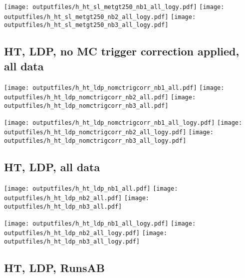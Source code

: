 \documentclass[11pt]{article}
\begin{document}
    \noindent
     \texttt{[image: outputfiles/h\_ht\_sl\_metgt250\_nb1\_all\_logy.pdf]}
     \texttt{[image: outputfiles/h\_ht\_sl\_metgt250\_nb2\_all\_logy.pdf]}
     \texttt{[image: outputfiles/h\_ht\_sl\_metgt250\_nb3\_all\_logy.pdf]}











     \subsection{ HT, LDP, no MC trigger correction applied, all data}

    \noindent
     \texttt{[image: outputfiles/h\_ht\_ldp\_nomctrigcorr\_nb1\_all.pdf]}
     \texttt{[image: outputfiles/h\_ht\_ldp\_nomctrigcorr\_nb2\_all.pdf]}
     \texttt{[image: outputfiles/h\_ht\_ldp\_nomctrigcorr\_nb3\_all.pdf]}

    \noindent
     \texttt{[image: outputfiles/h\_ht\_ldp\_nomctrigcorr\_nb1\_all\_logy.pdf]}
     \texttt{[image: outputfiles/h\_ht\_ldp\_nomctrigcorr\_nb2\_all\_logy.pdf]}
     \texttt{[image: outputfiles/h\_ht\_ldp\_nomctrigcorr\_nb3\_all\_logy.pdf]}


    \subsection{ HT, LDP, all data}

    \noindent
     \texttt{[image: outputfiles/h\_ht\_ldp\_nb1\_all.pdf]}
     \texttt{[image: outputfiles/h\_ht\_ldp\_nb2\_all.pdf]}
     \texttt{[image: outputfiles/h\_ht\_ldp\_nb3\_all.pdf]}

    \noindent
     \texttt{[image: outputfiles/h\_ht\_ldp\_nb1\_all\_logy.pdf]}
     \texttt{[image: outputfiles/h\_ht\_ldp\_nb2\_all\_logy.pdf]}
     \texttt{[image: outputfiles/h\_ht\_ldp\_nb3\_all\_logy.pdf]}

    \subsection{ HT, LDP, RunsAB}
\end{document}
